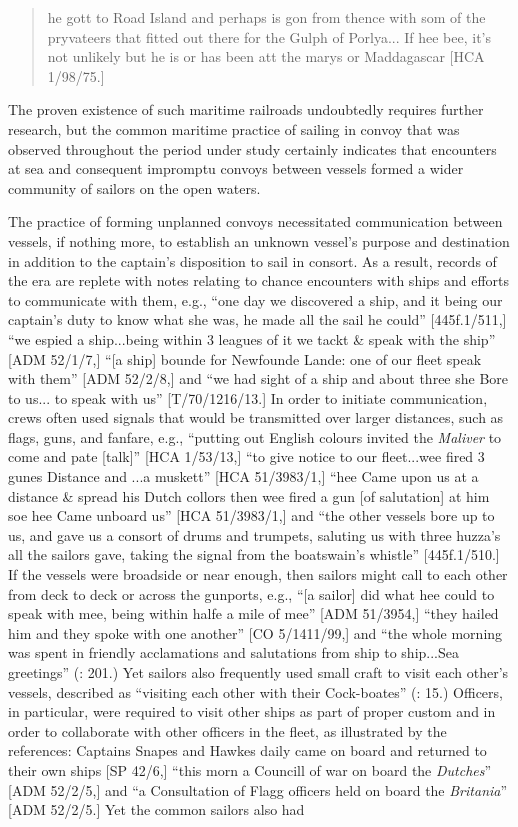 \begin{quotation}
he gott to Road Island and perhaps is gon from thence with som of the pryvateers that fitted out there for the Gulph of Porlya... If hee bee, it’s not unlikely but he is or has been att the marys or Maddagascar [HCA 1/98/75.] \end{quotation}

The proven existence of such maritime railroads undoubtedly requires further research, but the common maritime practice of sailing in convoy that was observed throughout the period under study certainly indicates that encounters at sea and consequent impromptu convoys between vessels formed a wider community of sailors on the open waters. 

The practice of forming unplanned convoys necessitated communication between vessels, if nothing more, to establish an unknown vessel’s purpose and destination in addition to the captain’s disposition to sail in consort. As a result, records of the era are replete with notes relating to chance encounters with ships and efforts to communicate with them, e.g., “one day we discovered a ship, and it being our captain’s duty to know what she was, he made all the sail he could” [445f.1/511,] “we espied a ship...being within 3 leagues of it we tackt \& speak with the ship” [ADM 52/1/7,] “[a ship] bounde for Newfounde Lande: one of our fleet speak with them” [ADM 52/2/8,] and “we had sight of a ship and about three she Bore to us... to speak with us” [T/70/1216/13.] In order to initiate communication, crews often used signals that would be transmitted over larger distances, such as flags, guns, and fanfare, e.g., “putting out English colours invited the \textit{Maliver} to come and pate [talk]” [HCA 1/53/13,] “to give notice to our fleet...wee fired 3 gunes Distance and ...a muskett” [HCA 51/3983/1,] “hee Came upon us at a distance \& spread his Dutch collors then wee fired a gun [of salutation] at him soe hee Came unboard us” [HCA 51/3983/1,] and “the other vessels bore up to us, and gave us a consort of drums and trumpets, saluting us with three huzza’s all the sailors gave, taking the signal from the boatswain’s whistle”  [445f.1/510.] If the vessels were broadside or near enough, then sailors might call to each other from deck to deck or across the gunports, e.g., “[a sailor] did what hee could to speak with mee, being within halfe a mile of mee” [ADM 51/3954,] “they hailed him and they spoke with one another” [CO 5/1411/99,] and “the whole morning was spent in friendly acclamations and salutations from ship to ship...Sea greetings” (\citealt{Gage1648}: 201.) Yet sailors also frequently used small craft to visit each other’s vessels, described as “visiting each other with their Cock-boates” (\citealt{Gage1648}: 15.)  Officers, in particular, were required to visit other ships as part of proper custom and in order to collaborate with other officers in the fleet, as illustrated by the references: Captains Snapes and Hawkes daily came on board and returned to their own ships [SP 42/6,] “this morn a Councill of war on board the \textit{Dutches}” [ADM 52/2/5,] and “a Consultation of Flagg officers held on board the \textit{Britania}” [ADM 52/2/5.] Yet the common sailors also had 